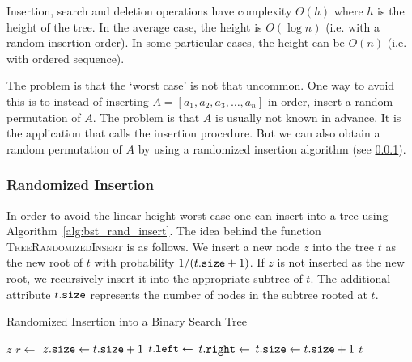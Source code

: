 Insertion, search and deletion operations have complexity \(\Theta(h)\) where \(h\) is the height of the tree.
In the average case, the height is \(O(\log n)\) (i.e. with a random insertion order).
In some particular cases, the height can be \(O(n)\) (i.e. with ordered sequence).

The problem is that the `worst case' is not that uncommon.
One way to avoid this is to instead of inserting \(A = [a_1, a_2, a_3, \ldots, a_n]\) in order, insert a random permutation of \(A\).
The problem is that \(A\) is usually not known in advance.
It is the application that calls the insertion procedure.
But we can also obtain a random permutation of \(A\) by using a randomized insertion algorithm (see \ref{subsubsec:bst_rand_insert}).

\subsubsection{Randomized Insertion}
\label{subsubsec:bst_rand_insert}
In order to avoid the linear-height worst case one can insert into a tree using Algorithm~\ref{alg:bst_rand_insert}.
The idea behind the function \textsc{TreeRandomizedInsert} is as follows. 
We insert a new node \(z\) into the tree \(t\) as the new root of \(t\) with probability \(1/(t\mathtt{.}\mathtt{size}+1)\).
If \(z\) is not inserted as the new root, we recursively insert it into the appropriate subtree of \(t\).
The additional attribute \(t\mathtt{.}\mathtt{size}\) represents the number of nodes in the subtree rooted at \(t\).

\begin{algorithm}[htb]
  \caption{Randomized Insertion into a Binary Search Tree}
  \label{alg:bst_rand_insert}
  \begin{algorithmic}[1]
        \State \Return $z$
      \EndIf
      \State $r \gets$  
       
        \State $z\mathtt{.}\mathtt{size}\gets t\mathtt{.}\mathtt{size}+1$
        \State \Return {} 
      \EndIf
        \State $t\mathtt{.}\mathtt{left}\gets$ 
      \Else
        \State $t\mathtt{.}\mathtt{right}\gets$ 
      \EndIf
      \State $t\mathtt{.}\mathtt{size}\gets t\mathtt{.}\mathtt{size}+1$
      \State \Return $t$
    \EndFunction
  \end{algorithmic}
\end{algorithm}

